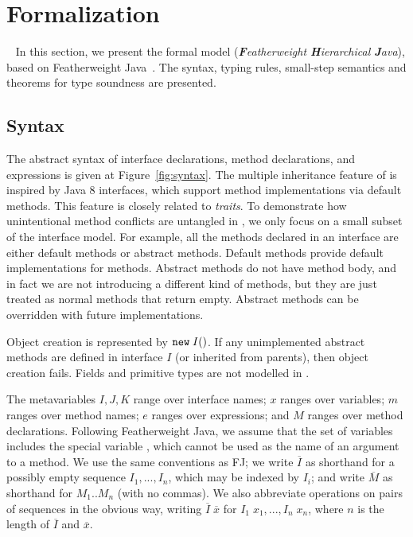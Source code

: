 \section{Formalization}~\label{sec:formalization}
In this section, we present the formal model \MIM{} (\emph{\textbf{F}eatherweight \textbf{H}ierarchical \textbf{J}ava}), based on
Featherweight Java~\cite{Igarashi01FJ}. The syntax, typing rules,
small-step semantics and theorems for type soundness are presented.

\vspace{-2ex}
\subsection{Syntax}
The abstract syntax of \MIM{} interface declarations, method declarations, and expressions is given at Figure~\ref{fig:syntax}. The multiple
inheritance feature of \MIM{} is inspired by Java 8 interfaces, which support
method implementations via default methods. This feature is 
closely related to \emph{traits}. To demonstrate how
unintentional method conflicts are untangled in \MIM{}, we only focus on a small subset of the interface model. For example, all the methods declared
in an interface are either default methods or abstract methods. Default methods provide default implementations for methods. Abstract methods do not
have method body, and in fact we are not introducing a different kind of methods, but they are just treated as normal methods that return empty. Abstract methods can be overridden with future implementations.

Object creation is represented by $\texttt{new} \; I()$. If any unimplemented abstract methods are defined in interface $I$ (or inherited from parents), then object creation fails. Fields and primitive types are not modelled in \MIM{}.

The metavariables $I, J, K$ range over interface names; $x$ ranges over variables; $m$ ranges over method names; $e$ ranges over expressions; and $M$ ranges over method declarations. Following Featherweight Java, we assume that the set of variables includes the special variable \kwthis, which cannot be used as the name of an argument to a method. We use the same
conventions as FJ; we write $\overline{I}$ as shorthand for a possibly empty sequence $I_1, ..., I_n$, which may be indexed by $I_i$; and write $\overline{M}$ as shorthand for $M_1 .. M_n$ (with no commas). We also abbreviate operations on pairs of sequences in the obvious way, writing $\overline{I} \; \overline{x}$ for $I_1 \; x_1, ..., I_n \; x_n$, where $n$ is the length of $\overline{I}$ and $\overline{x}$.

